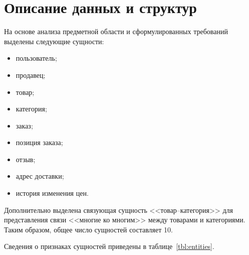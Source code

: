 
\section{Описание данных и структур}

На основе анализа предметной области и сформулированных требований выделены следующие сущности:

\begin{itemize}
    \item пользователь;
    \item продавец;
    \item товар;
    \item категория;
    \item заказ;
    \item позиция заказа;
    \item отзыв;
    \item адрес доставки;
    \item история изменения цен.
\end{itemize}

Дополнительно выделена связующая сущность <<товар--категория>> для представления связи <<многие ко многим>> между товарами и категориями. Таким образом, общее число сущностей составляет 10.

Сведения о признаках сущностей приведены в таблице~\ref{tbl:entities}.

